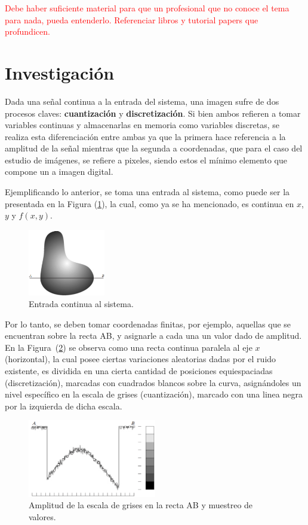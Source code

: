 	\textcolor{red}{Debe haber suficiente material para que un profesional que no conoce el tema para nada, pueda entenderlo. Referenciar libros y tutorial papers que profundicen.}
	
\section{Investigación}
Dada una señal continua a la entrada del sistema, una imagen sufre de dos procesos claves: \textbf{cuantización} y \textbf{discretización}. Si bien ambos refieren a tomar variables continuas y almacenarlas en memoria como variables discretas, se realiza esta diferenciación entre ambas ya que la primera hace referencia a la amplitud de la señal mientras que la segunda a coordenadas, que para el caso del estudio de imágenes, se refiere a pixeles, siendo estos el mínimo elemento que compone un a imagen digital.
	
Ejemplificando lo anterior, se toma una entrada al sistema, como puede ser la presentada en la Figura (\ref{fig:disc1}), la cual, como ya se ha mencionado, es continua en $x$, $y$ y $f(x,y)$.
\begin{figure}[H]
\centering
	\includegraphics[width=0.3\textwidth]{Imagenes/Digitalizacion_1.png}
	\caption{Entrada continua al sistema.}
	\label{fig:disc1}
\end{figure}

Por lo tanto, se deben tomar coordenadas finitas, por ejemplo, aquellas que se encuentran sobre la recta AB, y asignarle a cada una un valor dado de amplitud. En la Figura~(\ref{fig:disc2}) se observa como una recta continua paralela al eje $x$ (horizontal), la cual posee ciertas variaciones aleatorias dadas por el ruido existente, es dividida en una cierta cantidad de posiciones equiespaciadas (discretización), marcadas con cuadrados blancos sobre la curva, asignándoles un nivel específico en la escala de grises (cuantización), marcado con una linea negra por la izquierda de dicha escala.
\begin{figure}[H]
\centering
	\includegraphics[width=0.5\textwidth]{Imagenes/Digitalizacion_2.png}
	\caption{Amplitud de la escala de grises en la recta AB y muestreo de valores.}
	\label{fig:disc2}
\end{figure}


